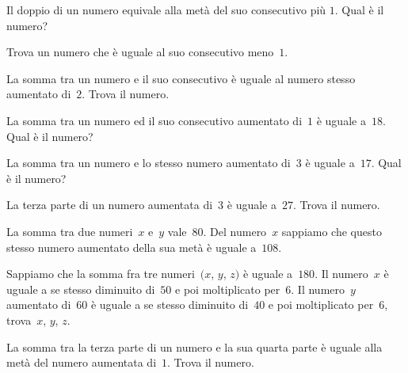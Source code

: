 \begin{multicols}{2}
\begin{esercizio}[\Ast]
\label{ese:16.20}
Il doppio di un numero equivale alla metà del suo consecutivo più $1$. Qual è il numero?
\end{esercizio}

\begin{esercizio}[\Ast]
\label{ese:16.21}
Trova un numero che è uguale al suo consecutivo meno~$1$.
\end{esercizio}

\begin{esercizio}[\Ast]
\label{ese:16.22}
La somma tra un numero e il suo consecutivo è uguale al numero stesso aumentato di~$2$. Trova il numero.
\end{esercizio}

\begin{esercizio}[\Ast]
\label{ese:16.23}
La somma tra un numero ed il suo consecutivo aumentato di~$1$ è uguale a~$18$. Qual è il numero?
\end{esercizio}

\begin{esercizio}
\label{ese:16.24}
La somma tra un numero e lo stesso numero aumentato di~$3$ è uguale a~$17$. Qual è il numero?
\end{esercizio}

\begin{esercizio}[\Ast]
\label{ese:16.25}
La terza parte di un numero aumentata di~$3$ è uguale a~$27$. Trova il numero.
\end{esercizio}

\begin{esercizio}[\Ast]
\label{ese:16.26}
La somma tra due numeri~$x$ e~$y$ vale~$80$. Del numero~$x$ sappiamo che questo stesso numero aumentato della sua metà è uguale a~$108$.
\end{esercizio}

\begin{esercizio}[\Ast]
\label{ese:16.27}
Sappiamo che la somma fra tre numeri~$(x$, $y$, $z)$ è uguale a~$180$. Il numero~$x$ è uguale a se stesso diminuito di~$50$ e poi moltiplicato per~$6$. 
Il numero~$y$ aumentato di~$60$ è uguale a se stesso diminuito di~$40$ e poi moltiplicato per~$6$, trova~$x$, $y$, $z$.
\end{esercizio}

\begin{esercizio}[\Ast]
\label{ese:16.28}
La somma tra la terza parte di un numero e la sua quarta parte è uguale alla metà del numero aumentata di~$1$. Trova il numero.
\end{esercizio}


\end{multicols}
